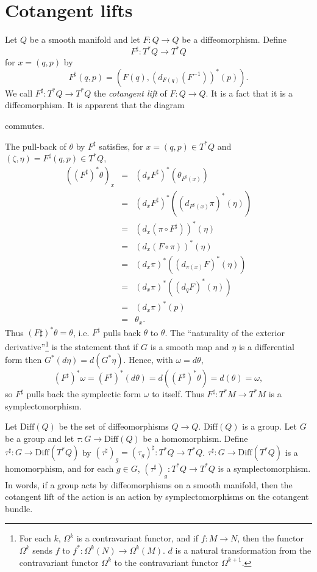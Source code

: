 \documentclass{article}
\newcommand{\Diff}{\textrm{Diff}}
\begin{document}
\section{Cotangent lifts}
Let $Q$ be a smooth manifold and let $F:Q \to Q$ be a diffeomorphism. Define
\[
F^\sharp:T^*Q \to T^*Q
\]
for $x=(q,p)$ by
\[
F^\sharp(q,p)=(F(q),(d_{F(q)} (F^{-1}))^*(p)).
\]
We call $F^\sharp:T^*Q \to T^*Q$ the {\em cotangent lift} of $F:Q \to Q$. It is a fact that it is a diffeomorphism. It is apparent that the diagram
\begin{center}
\end{center}
commutes.


The pull-back of $\theta$ by $F^\sharp$ satisfies, for $x=(q,p) \in T^*Q$ and $(\zeta,\eta)=F^\sharp(q,p) \in T^*Q$,
\begin{eqnarray*}
((F^\sharp)^* \theta)_x&=&(d_x F^\sharp)^*(\theta_{F^\sharp(x)})\\
&=&(d_x F^\sharp)^* ((d_{F^\sharp(x)} \pi)^*(\eta))\\
&=&(d_x (\pi \circ F^\sharp))^*(\eta)\\
&=&(d_x (F \circ \pi))^* (\eta)\\
&=&(d_x \pi)^* ( (d_{\pi(x)} F)^*(\eta)    )\\
&=&(d_x \pi)^* ( (d_q F)^*(\eta))\\
&=&(d_x \pi)^* (p)\\
&=&\theta_x.
\end{eqnarray*}
Thus $(F\sharp)^*\theta = \theta$, i.e. $F^\sharp$ pulls back $\theta$ to $\theta$. The ``naturality of the exterior derivative''\footnote{For each $k$, $\Omega^k$ is a contravariant functor, and  if $f:M \to N$, then the functor $\Omega^k$ sends $f$ to $f^*:\Omega^k(N) \to \Omega^k(M)$.
$d$ is a natural transformation from the contravariant functor $\Omega^k$ to the contravariant functor $\Omega^{k+1}$.} is the statement
that if $G$ is a smooth map and $\eta$ is a differential form then $G^*(d\eta)=d(G^*\eta)$. Hence, with $\omega=d\theta$,
\[
(F^\sharp)^* \omega = (F^\sharp)^* (d\theta)=d((F^\sharp)^* \theta)=d(\theta)=\omega,
\]
so $F^\sharp$ pulls back the symplectic form $\omega$  to  itself. Thus $F^\sharp:T^*M \to T^*M$ is a symplectomorphism.


Let $\Diff(Q)$ be the set of diffeomorphisms $Q \to Q$. $\Diff(Q)$ is a group. Let $G$ be a group and let $\tau:G \to \Diff(Q)$ be a homomorphism.
Define $\tau^\sharp:G \to \Diff(T^*Q)$ by $(\tau^\sharp)_g=(\tau_g)^\sharp:T^*Q \to T^*Q$. 
$\tau^\sharp:G \to \Diff(T^*Q)$ is a homomorphism, and for each $g \in G$, $(\tau^\sharp)_g:T^*Q \to T^*Q$ is a symplectomorphism.
In words, if a group acts by diffeomorphisms on a smooth manifold, then the cotangent lift of the action is an action by symplectomorphisms
on the cotangent bundle.
\end{document}
